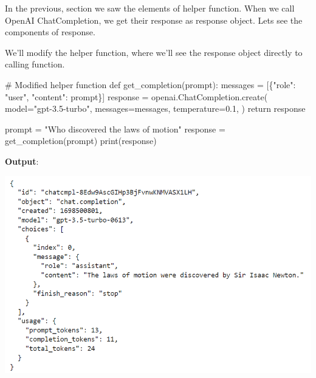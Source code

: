 \documentclass[
  letterpaper,
  DIV=11,
  numbers=noendperiod]{scrreprt}
\newenvironment{Shaded}{\begin{snugshade}}{\end{snugshade}}
\newcommand{\BuiltInTok}[1]{\textcolor[rgb]{0.00,0.23,0.31}{#1}}
\newcommand{\CommentTok}[1]{\textcolor[rgb]{0.37,0.37,0.37}{#1}}
\newcommand{\ControlFlowTok}[1]{\textcolor[rgb]{0.00,0.23,0.31}{#1}}
\newcommand{\FloatTok}[1]{\textcolor[rgb]{0.68,0.00,0.00}{#1}}
\newcommand{\KeywordTok}[1]{\textcolor[rgb]{0.00,0.23,0.31}{#1}}
\newcommand{\NormalTok}[1]{\textcolor[rgb]{0.00,0.23,0.31}{#1}}
\newcommand{\OperatorTok}[1]{\textcolor[rgb]{0.37,0.37,0.37}{#1}}
\newcommand{\StringTok}[1]{\textcolor[rgb]{0.13,0.47,0.30}{#1}}
\begin{document}
In the previous, section we saw the elements of helper function. When we
call OpenAI ChatCompletion, we get their response as response object.
Lets see the components of response.

We'll modify the helper function, where we'll see the response object
directly to calling function.

\begin{Shaded}
\begin{Highlighting}[]
\CommentTok{\# Modified helper function}
\KeywordTok{def}\NormalTok{ get\_completion(prompt):}
\NormalTok{    messages }\OperatorTok{=}\NormalTok{ [\{}\StringTok{"role"}\NormalTok{: }\StringTok{"user"}\NormalTok{, }\StringTok{"content"}\NormalTok{: prompt\}]}
\NormalTok{    response }\OperatorTok{=}\NormalTok{ openai.ChatCompletion.create(}
\NormalTok{        model}\OperatorTok{=}\StringTok{"gpt{-}3.5{-}turbo"}\NormalTok{,}
\NormalTok{        messages}\OperatorTok{=}\NormalTok{messages,}
\NormalTok{        temperature}\OperatorTok{=}\FloatTok{0.1}\NormalTok{, }
\NormalTok{    )}
    \ControlFlowTok{return}\NormalTok{ response}
\end{Highlighting}
\end{Shaded}

\begin{Shaded}
\begin{Highlighting}[]
\NormalTok{prompt }\OperatorTok{=} \StringTok{"Who discovered the laws of motion"}
\NormalTok{response }\OperatorTok{=}\NormalTok{ get\_completion(prompt)}
\BuiltInTok{print}\NormalTok{(response)}
\end{Highlighting}
\end{Shaded}

\textbf{Output}:

\includegraphics{images/ch2/2_response_object.png}
\end{document}
